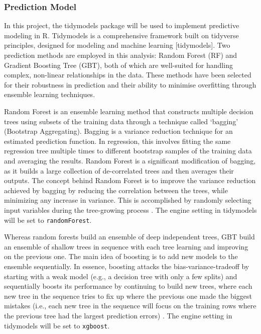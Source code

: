 \documentclass[11pt,a4paper,]{article}
\begin{document}
\subsubsection{Prediction Model}\label{prediction-model}

In this project, the tidymodels package will be used to implement predictive modeling in R. Tidymodels is a comprehensive framework built on tidyverse principles, designed for modeling and machine learning {[}tidymodels{]}. Two prediction methods are employed in this analysis: Random Forest (RF) and Gradient Boosting Tree (GBT), both of which are well-suited for handling complex, non-linear relationships in the data. These methods have been selected for their robustness in prediction and their ability to minimise overfitting through ensemble learning techniques.

Random Forest is an ensemble learning method that constructs multiple decision trees using subsets of the training data through a technique called `bagging' (Bootstrap Aggregating). Bagging is a variance reduction technique for an estimated prediction function. In regression, this involves fitting the same regression tree multiple times to different bootstrap samples of the training data and averaging the results. Random Forest is a significant modification of bagging, as it builds a large collection of de-correlated trees and then averages their outputs. The concept behind Random Forest is to improve the variance reduction achieved by bagging by reducing the correlation between the trees, while minimizing any increase in variance. This is accomplished by randomly selecting input variables during the tree-growing process \autocite{Hastie09,Breiman01}. The engine setting in tidymodels will be set to \texttt{randomForest}.

Whereas random forests build an ensemble of deep independent trees, GBT build an ensemble of shallow trees in sequence with each tree learning and improving on the previous one. The main idea of boosting is to add new models to the ensemble sequentially. In essence, boosting attacks the bias-variance-tradeoff by starting with a weak model (e.g., a decision tree with only a few splits) and sequentially boosts its performance by continuing to build new trees, where each new tree in the sequence tries to fix up where the previous one made the biggest mistakes (i.e., each new tree in the sequence will focus on the training rows where the previous tree had the largest prediction errors) \autocite{boehmke2019}. The engine setting in tidymodels will be set to \texttt{xgboost}.
\end{document}
